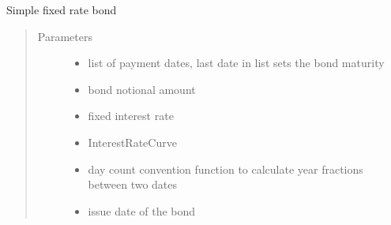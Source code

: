 \documentclass[a4paper,10pt,english]{sphinxmanual}
\begin{document}
\begin{fulllineitems}
\begin{fulllineitems}
\label{\detokenize{api/Derivate:Derivate.session1_exercise3.BondCashFlowLegList.__init__}}
\sphinxAtStartPar
Simple fixed rate bond
\begin{quote}\begin{description}
\item[{Parameters}] \leavevmode\begin{itemize}
\item {} 
\sphinxAtStartPar
{} \textendash{} list of payment dates,
last date in list sets the bond maturity

\item {} 
\sphinxAtStartPar
{} \textendash{} bond notional amount

\item {} 
\sphinxAtStartPar
{} \textendash{} fixed interest rate

\item {} 
\sphinxAtStartPar
{} \textendash{} InterestRateCurve

\item {} 
\sphinxAtStartPar
{} \textendash{} day count convention function
to calculate year fractions between two dates

\item {} 
\sphinxAtStartPar
{} \textendash{} issue date of the bond

\end{itemize}

\end{description}\end{quote}

\end{fulllineitems}


\end{fulllineitems}
\end{document}
